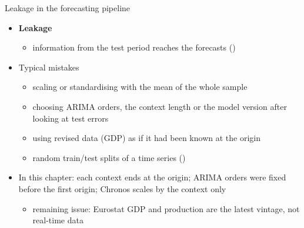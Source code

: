 \begin{frame}{Leakage in the forecasting pipeline}
\itemsize{\footnotesize}
\begin{itemize}
    \item \textbf{Leakage}
    \begin{itemize}
        \item information from the test period reaches the forecasts ()
    \end{itemize}
    \item Typical mistakes
    \begin{itemize}
        \item scaling or standardising with the mean of the whole sample
        \item choosing ARIMA orders, the context length or the model version after looking at test errors
        \item using revised data (GDP) as if it had been known at the origin
        \item random train/test splits of a time series ()
    \end{itemize}
    \item In this chapter: each context ends at the origin; ARIMA orders were fixed before the first origin; Chronos scales by the context only
    \begin{itemize}
        \item remaining issue: Eurostat GDP and production are the latest vintage, not real-time data
    \end{itemize}
\end{itemize}
\end{frame}

